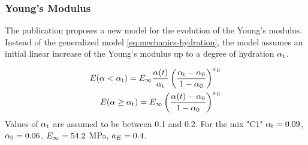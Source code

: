 \subsubsection{Young's Modulus}
The publication proposes a new model for the evolution of the Young's modulus.
Instead of the generalized model \eqref{eq:mechanics-hydration}, the model assumes an initial linear increase of the Young's modulus up to a degree of hydration $\alpha_{\text{t}}$.

\begin{align}
	E(\alpha < \alpha_{\text{t}}) = E_\infty  \frac{\alpha(t)}{\alpha_{\text{t}}}\left( \frac{\alpha_{\text{t}}-\alpha_{0}}{1-\alpha_{0}}\right)^{a_{E}}  \\
	E(\alpha \ge \alpha_{\text{t}}) = E_\infty  \left( \frac{\alpha(t)-\alpha_{0}}{1-\alpha_{0}}\right)^{a_{E}}  
\end{align}
Values of $\alpha_{\text{t}}$ are assumed to be between 0.1 and 0.2.
For the mix "C1" $\alpha_{\text{t}} = 0.09$, $\alpha_{0} = 0.06$, $E_\infty = 54.2$ MPa, $a_{E} = 0.4$.
